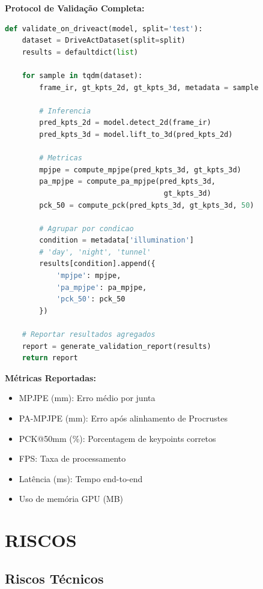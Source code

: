 \documentclass[12pt, a4paper]{article}
\begin{document}
\textbf{Protocol de Validação Completa:}

\begin{lstlisting}[language=Python, caption=Script de Validação]
def validate_on_driveact(model, split='test'):
    dataset = DriveActDataset(split=split)
    results = defaultdict(list)
    
    for sample in tqdm(dataset):
        frame_ir, gt_kpts_2d, gt_kpts_3d, metadata = sample
        
        # Inferencia
        pred_kpts_2d = model.detect_2d(frame_ir)
        pred_kpts_3d = model.lift_to_3d(pred_kpts_2d)
        
        # Metricas
        mpjpe = compute_mpjpe(pred_kpts_3d, gt_kpts_3d)
        pa_mpjpe = compute_pa_mpjpe(pred_kpts_3d, 
                                     gt_kpts_3d)
        pck_50 = compute_pck(pred_kpts_3d, gt_kpts_3d, 50)
        
        # Agrupar por condicao
        condition = metadata['illumination']  
        # 'day', 'night', 'tunnel'
        results[condition].append({
            'mpjpe': mpjpe,
            'pa_mpjpe': pa_mpjpe,
            'pck_50': pck_50
        })
    
    # Reportar resultados agregados
    report = generate_validation_report(results)
    return report
\end{lstlisting}

\textbf{Métricas Reportadas:}
\begin{itemize}
    \item MPJPE (mm): Erro médio por junta
    \item PA-MPJPE (mm): Erro após alinhamento de Procrustes
    \item PCK@50mm (\%): Porcentagem de keypoints corretos
    \item FPS: Taxa de processamento
    \item Latência (ms): Tempo end-to-end
    \item Uso de memória GPU (MB)
\end{itemize}

\section{RISCOS}

\subsection{Riscos Técnicos}
\end{document}
